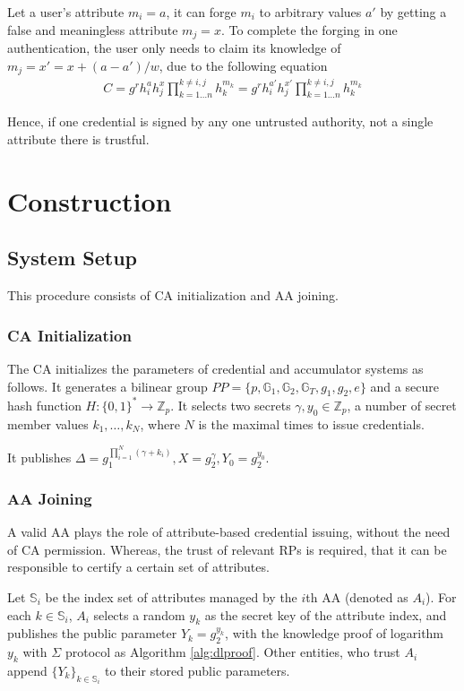\documentclass[journal]{IEEEtran}
\begin{document}
Let a user's attribute $m_i = a$, it can forge $m_i$ to arbitrary values $a'$ by getting a false and meaningless attribute $m_j =x$. To complete the forging in one authentication, the user only needs to claim its knowledge of $m_j = x' = x + (a-a')/w$, due to the following equation
\begin{align}
	C = g^r h_i^a h_j^x\prod_{k=1\dots n}^{k\neq i,j} h_k^{m_k} = g^r h_i^{a'} h_j^{x'}\prod_{k=1\dots n}^{k\neq i,j} h_k^{m_k}
\end{align}

Hence, if one credential is signed by any one untrusted authority, not a single attribute there is trustful.
\section{Construction}	
	\subsection{System Setup}
	This procedure consists of CA initialization and AA joining. 
	\subsubsection{CA Initialization}
	The CA initializes the parameters of credential and accumulator systems as follows. It generates a bilinear group $PP=\{p, \mathbb{G}_1, \mathbb{G}_2, \mathbb{G}_T, g_1, g_2, e\}$ and a secure hash function $H:\{0,1\}^*\rightarrow \mathbb{Z}_p$. It selects two secrets $\gamma, y_0\in \mathbb{Z}_p$, a number of secret member values $k_1, \dots, k_N$, where $N$ is the maximal times to issue credentials.
	
	It publishes $\Delta = g_1^{\prod_{i=1}^{N}(\gamma+k_i)}, X= g_2^\gamma, Y_0= g_2^{y_0}$.
	\subsubsection{AA Joining}
	A valid AA plays the role of attribute-based credential issuing, without the need of CA permission. Whereas, the trust of relevant RPs is required, that it can be responsible to certify a certain set of attributes.
	
	Let $\mathbb{S}_i$ be the index set of attributes managed by the $i$th AA (denoted as $A_i$). For each $k\in \mathbb{S}_i$, $A_i$ selects a random $y_k$ as the secret key of the attribute index, and publishes the public parameter $Y_k = g_2^{y_k}$, with the knowledge proof of logarithm $y_k$ with $\Sigma$ protocol as Algorithm \ref{alg:dlproof}. 
	Other entities, who trust $A_i$ append $\{Y_k\}_{k\in \mathbb{S}_i}$ to their stored public parameters.
	
\end{document}
